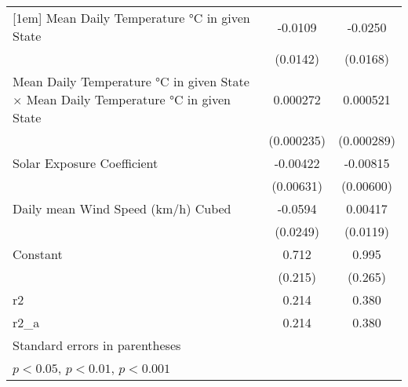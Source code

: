 {\begin{tabular}{l*{2}{c}}
[1em]
Mean Daily Temperature °C in given State&     -0.0109         &     -0.0250         \\
                    &    (0.0142)         &    (0.0168)         \\
[1em]
Mean Daily Temperature °C in given State $\times$ Mean Daily Temperature °C in given State&    0.000272         &    0.000521         \\
                    &  (0.000235)         &  (0.000289)         \\
[1em]
Solar Exposure Coefficient&    -0.00422         &    -0.00815         \\
                    &   (0.00631)         &   (0.00600)         \\
[1em]
Daily mean Wind Speed (km/h) Cubed&     -0.0594         &     0.00417         \\
                    &    (0.0249)         &    (0.0119)         \\
[1em]
Constant            &       0.712\sym{*}  &       0.995\sym{*}  \\
                    &     (0.215)         &     (0.265)         \\
\hline
r2                  &       0.214         &       0.380         \\
r2\_a                &       0.214         &       0.380         \\
\hline\hline
\multicolumn{3}{l}{\footnotesize Standard errors in parentheses}\\
\multicolumn{3}{l}{\footnotesize \sym{*} \(p<0.05\), \sym{**} \(p<0.01\), \sym{***} \(p<0.001\)}\\
\end{tabular}
}
